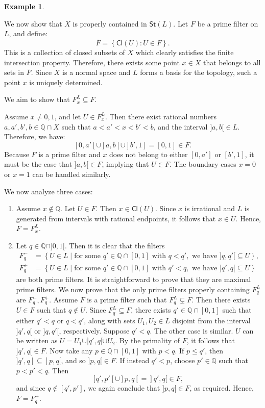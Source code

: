 \documentclass{article}
\theoremstyle{plain}
\theoremstyle{definition}
\newtheorem{example}[theorem]{Example}
\theoremstyle{remark}
\newcommand{\bool}[1]{\mathsf{#1}}
\newcommand{\0}{\mathbbm 0}
\newcommand{\1}{\mathbbm 1}
\newcommand{\2}{\mathbbm 2}
\begin{document}
\begin{example}
\begin{itemize}
We now show that \(X\) is properly contained in \(\bool{St}(L)\). Let \(F\) be a prime filter on \(L\), and define:
\[
\bar{F} = \left\{ \bool{Cl}(U) : U \in F \right\}.
\]
This is a collection of closed subsets of \(X\) which clearly satisfies the finite intersection property. Therefore, there exists some point \(x \in X\) that belongs to all sets in \(\bar{F}\). Since \(X\) is a normal space and \(L\) forms a basis for the topology, such a point \(x\) is uniquely determined.

We aim to show that \(F^L_x \subseteq F\). 

Assume \(x \neq 0, 1\), and let \(U \in F^L_x\). Then there exist rational numbers \(a, a', b', b \in \mathbb{Q} \cap X\) such that \(a < a' < x < b' < b\), and the interval \(]a, b[ \in L\). Therefore, we have:
\[
[0,a'[ \cup ]a, b[ \cup ]b',1] = [0,1] \in F.
\]
Because \(F\) is a prime filter and \(x\) does not belong to either \([0,a']\) or \([b',1]\), it must be the case that \(]a,b[ \in F\), implying that \(U \in F\). The boundary cases \(x = 0\) or \(x = 1\) can be handled similarly.

We now analyze three cases:

\begin{enumerate}
    \item Assume \(x \notin \mathbb{Q}\). Let \(U \in F\). Then \(x \in \bool{Cl}(U)\). Since \(x\) is irrational and \(L\) is generated from intervals with rational endpoints, it follows that \(x \in U\). Hence, \(F = F^L_x\).
    
    \item Let \(q \in \mathbb{Q} \cap ]0,1[\). Then it is clear that the filters
    \begin{align*}
    F_q^- &= \left\{ U \in L \mid \text{for some } q' \in \mathbb{Q} \cap [0,1] \text{ with } q < q', \text{ we have } ]q, q'[ \subseteq U \right\}, \\
    F_q^+ &= \left\{ U \in L \mid \text{for some } q' \in \mathbb{Q} \cap [0,1] \text{ with } q' < q, \text{ we have } ]q', q[ \subseteq U \right\}
    \end{align*}
    are both prime filters. It is straightforward to prove that they are maximal prime filters. 
    We now prove that the only prime filters properly containing \(F_q^L\) are \(F_q^-, F_q^+\). Assume \(F\) is a prime filter such that \(F_q^L \subsetneq F\). Then there exists \(U \in F\) such that \(q \notin U\). Since \(F^L_q \subseteq F\), there exists \(q' \in \mathbb{Q} \cap [0,1]\) such that either \(q' < q\) or \(q < q'\), along with sets \(U_1, U_2 \in L\) disjoint from the interval \(]q', q[\) or \(]q, q'[\), respectively. Suppose \(q'< q\). The other case is similar. \(U\) can be written as \(U = U_1 \cup ]q', q[ \cup U_2\).
    By the primality of \(F\), it follows that  \(]q', q[ \in F\). Now take any \(p \in \mathbb{Q} \cap [0,1]\) with \(p < q\). If \(p \leq q'\), then \(]q', q[ \subseteq ]p, q[\), and so \(]p, q[ \in F\). If instead \(q' < p\), choose \(p' \in \mathbb{Q}\) such that \(p < p' < q\). Then
    \[
    ]q', p'[ \cup ]p, q[ = ]q', q[ \in F,
    \]
    and since \(q \notin [q', p'] \), we again conclude that \(]p, q[ \in F\), as required. Hence, \(F=F_q^+\). 
    

\end{enumerate}
\end{itemize}
\end{example}
\end{document}
